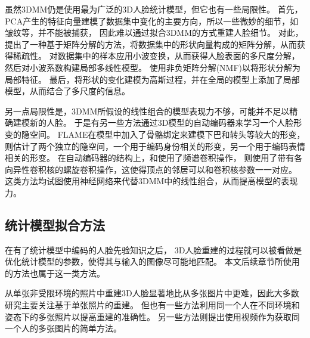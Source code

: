 虽然3DMM仍是使用最为广泛的3D人脸统计模型，但它也有一些局限性。
首先，PCA产生的特征向量建模了数据集中变化的主要方向，所以一些微妙的细节，如皱纹等，并不能被捕获，
因此难以通过拟合3DMM的方式重建人脸细节。
对此，\citet{ferrari2017dictionary}提出了一种基于矩阵分解的方法，将数据集中的形状向量构成的矩阵分解，从而获得稀疏性。
\citet{brunton2014multilinear}对数据集中的样本应用小波变换，从而获得人脸表面的多尺度分解，然后对小波系数构建局部多线性模型。
\citet{jin2017robust}使用非负矩阵分解(NMF)以将形状分解为局部特征。
最后，\citet{luthi2017gaussian}将形状的变化建模为高斯过程，并在全局的模型上添加了局部模型，从而结合了多尺度的信息。

另一点局限性是，3DMM所假设的线性组合的模型表现力不够，可能并不足以精确建模新的人脸。
于是有另一些方法通过3D模型的自动编码器来学习一个人脸形变的隐空间。
FLAME\citep{FLAME}在模型中加入了骨骼绑定来建模下巴和转头等较大的形变，
\citet{jiang2019disentangled}则估计了两个独立的隐空间，一个用于编码身份相关的形变，另一个用于编码表情相关的形变。
在自动编码器的结构上，\citet{ranjan2018generating}和\citet{jiang2019disentangled}使用了频谱卷积操作，
\citet{bouritsas2019neural}则使用了带有各向异性卷积核的螺旋卷积操作，这使得顶点的邻居可以和卷积核参数一一对应。
这类方法均试图使用神经网络来代替3DMM中的线性组合，从而提高模型的表现力。

\subsection{统计模型拟合方法}

在有了统计模型中编码的人脸先验知识之后，
3D人脸重建的过程就可以被看做是优化统计模型的参数，使得其与输入的图像尽可能地匹配。
本文后续章节所使用的方法也属于这一类方法。

从单张非受限环境的照片中重建3D人脸显著地比从多张图片中更难，因此大多数研究主要关注基于单张照片的重建。
但也有一些方法\citep{deep3d,piotraschke2016automated}利用同一个人在不同环境和姿态下的多张照片以提高重建的准确性。
另一些方法\citep{ShiWTC14,GarridoVWT13}则提出使用视频作为获取同一个人的多张图片的简单方法。

